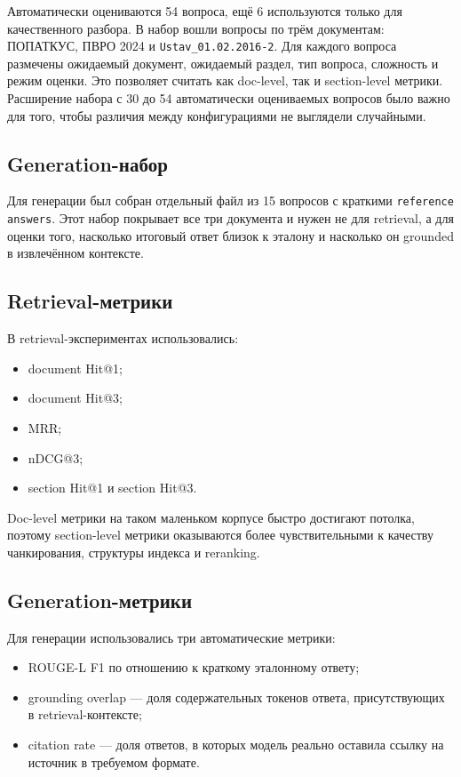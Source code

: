 \documentclass[12pt,a4paper]{article}
\begin{document}
Автоматически оцениваются 54 вопроса, ещё 6 используются только для качественного разбора. В набор вошли вопросы по трём документам: ПОПАТКУС, ПВРО 2024 и \texttt{Ustav\_01.02.2016-2}. Для каждого вопроса размечены ожидаемый документ, ожидаемый раздел, тип вопроса, сложность и режим оценки. Это позволяет считать как doc-level, так и section-level метрики. Расширение набора с 30 до 54 автоматически оцениваемых вопросов было важно для того, чтобы различия между конфигурациями не выглядели случайными.

\subsection{Generation-набор}

Для генерации был собран отдельный файл  из 15 вопросов с краткими \texttt{reference answers}. Этот набор покрывает все три документа и нужен не для retrieval, а для оценки того, насколько итоговый ответ близок к эталону и насколько он grounded в извлечённом контексте.

\subsection{Retrieval-метрики}

В retrieval-экспериментах использовались:
\begin{itemize}
    \item document Hit@1;
    \item document Hit@3;
    \item MRR;
    \item nDCG@3;
    \item section Hit@1 и section Hit@3.
\end{itemize}

Doc-level метрики на таком маленьком корпусе быстро достигают потолка, поэтому section-level метрики оказываются более чувствительными к качеству чанкирования, структуры индекса и reranking.

\subsection{Generation-метрики}

Для генерации использовались три автоматические метрики:
\begin{itemize}
    \item ROUGE-L F1 по отношению к краткому эталонному ответу;
    \item grounding overlap --- доля содержательных токенов ответа, присутствующих в retrieval-контексте;
    \item citation rate --- доля ответов, в которых модель реально оставила ссылку на источник в требуемом формате.
\end{itemize}
\end{document}
